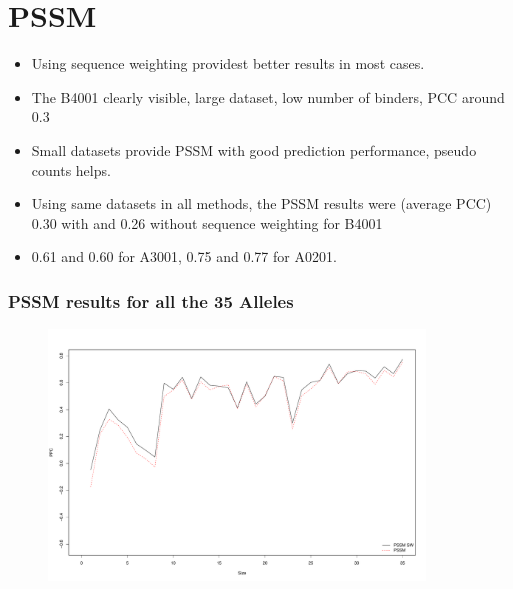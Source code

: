 \documentclass[presentation]{beamer}   %
\begin{document}
\section{PSSM}
\begin{frame}
 \begin{itemize}
\item<1> Using sequence weighting providest better results in most cases.
\item<2> The B4001 clearly visible, large dataset, low number of binders, PCC around 0.3
\item<3> Small datasets provide PSSM with good prediction performance, pseudo counts helps.
\item<4> Using same datasets in all methods, the PSSM results were (average PCC) 0.30 with and 0.26 without sequence weighting for B4001
\item<5> 0.61 and 0.60 for A3001, 0.75 and 0.77 for A0201.
\end{itemize}
\end{frame}

\begin{frame}
\frametitle{PSSM results for all the 35 Alleles}
 \begin{figure}[ht]
  \begin{center}
   \includegraphics[width=10cm]{fig/pssmLN1.pdf}
  \end{center}
 \end{figure}
\end{frame}

\begin{frame}
\end{frame}
\end{document}
